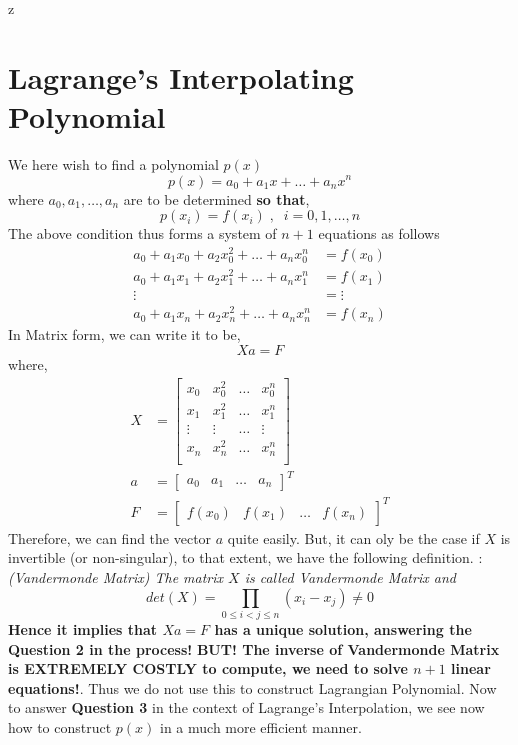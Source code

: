 z\documentclass[a4paper,12pt,twoside]{book}
\newcommand{\nll}[0]{\newline\newline}
\newcommand{\tit}[1]{\textit{#1}}
\newcommand{\defin}[0]{\boxed{\textbf{\textit{Definition}}}}
\begin{document}
\section{Lagrange's Interpolating Polynomial}
We here wish to find a polynomial $p(x)$
\[ p(x) = a_0 + a_1 x + \dots + a_nx^n \]
where $a_0, a_1, \dots, a_n$ are to be determined \textbf{so that},
\[ p(x_i) = f(x_i)\;,\;\;i=0,1,\dots,n \]
The above condition thus forms a system of $n+1$ equations as follows
\begin{equation*}
    \begin{split}
        a_0 + a_1x_0 + a_2x_0^2 + \dots + a_nx_0^n &= f(x_0)\\
        a_0 + a_1x_1 + a_2x_1^2 + \dots + a_nx_1^n &= f(x_1)\\
        \vdots &= \vdots\\
        a_0 + a_1x_n + a_2x_n^2 + \dots + a_nx_n^n &= f(x_n)
    \end{split}
\end{equation*}
In Matrix form, we can write it to be,
\[ Xa = F \]
where,
\begin{equation*}
\begin{split}
    X &= \begin{bmatrix} x_0 & x_0^2 & \dots & x_0^n\\
    x_1 & x_1^2 & \dots & x_1^n\\
    \vdots & \vdots & \dots & \vdots\\
    x_n & x_n^2 & \dots & x_n^n\\
    \end{bmatrix}\\
    a &= \begin{bmatrix} a_0 & a_1 & \dots & a_n\end{bmatrix}^T\\
    F &= \begin{bmatrix} f(x_0) & f(x_1) & \dots & f(x_n)\end{bmatrix}^T
    \end{split}
\end{equation*}
Therefore, we can find the vector $a$ quite easily. But, it can oly be the case if $X$ is invertible (or non-singular), to that extent, we have the following definition.
\nll
\defin  : \tit{(Vandermonde Matrix) The matrix $X$ is called Vandermonde Matrix and 
\[ det(X) = \prod_{0\le i<j\le n}(x_i - x_j) \neq 0 \]
}
\textbf{Hence it implies that $Xa = F$ has a unique solution, answering the Question 2 in the process!}
\nll
\textbf{BUT! The inverse of Vandermonde Matrix is EXTREMELY COSTLY to compute, we need to solve $n+1$ linear equations!}. Thus we do not use this to construct Lagrangian Polynomial.
\nll
Now to answer \textbf{Question 3} in the context of Lagrange's Interpolation, we see now how to construct $p(x)$ in a much more efficient manner.
\end{document}

